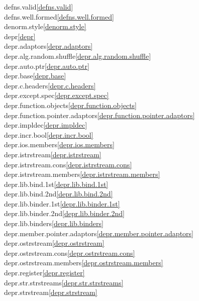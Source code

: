 \begin{multicols}{2}
defns.valid\quad\ref{defns.valid}\\
defns.well.formed\quad\ref{defns.well.formed}\\
denorm.style\quad\ref{denorm.style}\\
depr\quad\ref{depr}\\
depr.adaptors\quad\ref{depr.adaptors}\\
depr.alg.random.shuffle\quad\ref{depr.alg.random.shuffle}\\
depr.auto.ptr\quad\ref{depr.auto.ptr}\\
depr.base\quad\ref{depr.base}\\
depr.c.headers\quad\ref{depr.c.headers}\\
depr.except.spec\quad\ref{depr.except.spec}\\
depr.function.objects\quad\ref{depr.function.objects}\\
depr.function.pointer.adaptors\quad\ref{depr.function.pointer.adaptors}\\
depr.impldec\quad\ref{depr.impldec}\\
depr.incr.bool\quad\ref{depr.incr.bool}\\
depr.ios.members\quad\ref{depr.ios.members}\\
depr.istrstream\quad\ref{depr.istrstream}\\
depr.istrstream.cons\quad\ref{depr.istrstream.cons}\\
depr.istrstream.members\quad\ref{depr.istrstream.members}\\
depr.lib.bind.1st\quad\ref{depr.lib.bind.1st}\\
depr.lib.bind.2nd\quad\ref{depr.lib.bind.2nd}\\
depr.lib.binder.1st\quad\ref{depr.lib.binder.1st}\\
depr.lib.binder.2nd\quad\ref{depr.lib.binder.2nd}\\
depr.lib.binders\quad\ref{depr.lib.binders}\\
depr.member.pointer.adaptors\quad\ref{depr.member.pointer.adaptors}\\
depr.ostrstream\quad\ref{depr.ostrstream}\\
depr.ostrstream.cons\quad\ref{depr.ostrstream.cons}\\
depr.ostrstream.members\quad\ref{depr.ostrstream.members}\\
depr.register\quad\ref{depr.register}\\
depr.str.strstreams\quad\ref{depr.str.strstreams}\\
depr.strstream\quad\ref{depr.strstream}\\

\end{multicols}
